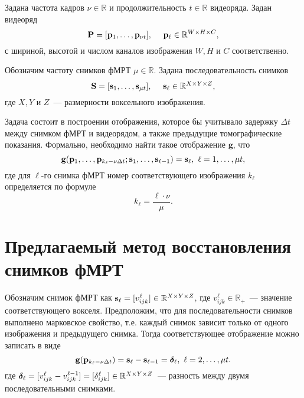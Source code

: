 \documentclass[a4paper, 12pt]{extarticle}
\begin{document}
Задана частота кадров $\nu \in \mathbb{R}$ и продолжительность $t \in \mathbb{R}$ видеоряда.
Задан видеоряд
\begin{equation}
	\label{eq1}
	\mathbf{P} = [\mathbf{p}_1, \ldots, \mathbf{p}_{\nu t}], \quad\
	\mathbf{p}_{\ell} \in \mathbb{R}^{W \times H \times C},
\end{equation}
с шириной, высотой и числом каналов изображения $W, H$ и
$C$ соответственно.

Обозначим частоту снимков фМРТ $\mu \in \mathbb{R}$. Задана последовательность снимков
\begin{equation}
	\label{eq2}
	\mathbf{S} = [\mathbf{s}_1, \ldots, \mathbf{s}_{\mu t}], \quad\
	\mathbf{s}_{\ell} \in \mathbb{R}^{X \times Y \times Z},
\end{equation}
где $X, Y$ и $Z$~--- размерности воксельного изображения.

Задача состоит в построении отображения, которое бы учитывало задержку $\Delta t$ между
снимком фМРТ и видеорядом, а также предыдущие томографические показания. Формально, необходимо
найти такое отображение $\mathbf{g}$, что
\begin{equation}
	\label{eq3}
	\mathbf{g}(\mathbf{p}_1, \ldots, \mathbf{p}_{k_{\ell} - \nu \Delta t}; \mathbf{s}_1, \ldots, \mathbf{s}_{\ell-1}) = \mathbf{s}_{\ell},
	\ \ell = 1, \ldots, \mu t,
\end{equation}
где для $\ell$-го снимка фМРТ номер соответствующего изображения $k_{\ell}$ определяется по формуле
\begin{equation}
	\label{eq4}
	k_{\ell} = \dfrac{\ell \cdot \nu}{\mu}.
\end{equation}

\section{Предлагаемый метод восстановления снимков фМРТ}

Обозначим снимок фМРТ как $\mathbf{s}_{\ell} = [v^{\ell}_{ijk}] \in \mathbb{R}^{X \times Y \times Z}$,
где $v^{\ell}_{ijk} \in \mathbb{R}_+$~--- значение соответствующего вокселя.
Предположим, что для последовательности снимков выполнено марковское свойство,
т.е. каждый снимок зависит только от одного изображения и предыдущего снимка.
Тогда соответствующее отображение можно записать в виде
\begin{equation}
	\label{eq5}
	\mathbf{g}(\mathbf{p}_{k_{\ell} - \nu \Delta t}) = \mathbf{s}_{\ell} - \mathbf{s}_{\ell-1} = \boldsymbol{\delta}_{\ell}, \ \ell = 2, \ldots, \mu t.
\end{equation}
где $\boldsymbol{\delta}_{\ell} = [v^{\ell}_{ijk} - v^{\ell-1}_{ijk}] = [\delta^{\ell}_{ijk}] \in \mathbb{R}^{X \times Y \times Z}$~--- разность между двумя последовательными снимками.
\end{document}
